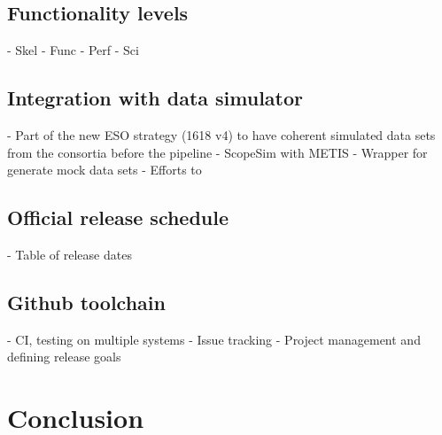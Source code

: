 \documentclass[]{spie}  %
\begin{document}
\subsection{Functionality levels}
\label{ssec:dev_levels}
	- Skel
	- Func
	- Perf
	- Sci
\subsection{Integration with data simulator}
\label{ssec:dev_scopesim}
	- Part of the new ESO strategy (1618 v4) to have coherent simulated data sets from the consortia before the pipeline 
	- ScopeSim with METIS
	- Wrapper for generate mock data sets
	- Efforts to 
\subsection{Official release schedule}
\label{ssec:dev_releases}
	- Table of release dates
\subsection{Github toolchain}
\label{ssec:dev_testing}
	- CI, testing on multiple systems
	- Issue tracking
	- Project management and defining release goals

\section{Conclusion}
\label{sec:conclusion}






\appendix    %

\acknowledgments %

\end{document}
